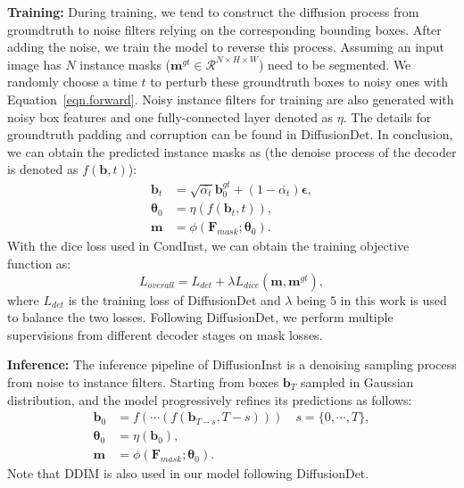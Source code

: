\documentclass{article}
\begin{document}
\noindent \textbf{Training:} During training, we tend to construct the diffusion process from groundtruth to noise filters relying on the corresponding bounding boxes. After adding the noise, we train the model to reverse this process. Assuming an input image has $N$ instance masks ($\mathbf{m}^{gt}\in \mathcal{R}^{N\times H \times W}$) need to be segmented. We randomly choose a time $t$ to perturb these groundtruth boxes to noisy ones with Equation~\ref{eqn.forward}. Noisy instance filters for training are also generated with noisy box features and one fully-connected layer denoted as $\eta$. The details for groundtruth padding and corruption can be found in DiffusionDet. In conclusion, we can obtain the predicted instance masks as (the denoise process of the decoder is denoted as $f(\bm{b},t)$): 
\begin{equation}
\begin{split}
\bm{b}_t &= \sqrt{\bar{\alpha_t}}\bm{b}^{gt}_0+(1-\bar{\alpha_t})\mathbf{\epsilon}, \\
\bm{\theta}_0 &= \eta(f(\bm{b}_t,t)), \\
\mathbf{m} &= \mathcal{\phi}(\mathbf{{F}}_{mask};\bm{\theta}_0).
\end{split}
\end{equation}
With the dice loss\cite{milletari2016v} used in CondInst, we can obtain the training objective function as:
\begin{equation}
L_{overall}= L_{det} + \lambda L_{dice}(\mathbf{m},\mathbf{m}^{gt}),
\end{equation}
where $L_{det}$ is the training loss of DiffusionDet and $\lambda$ being $5$ in this work is used to balance the two losses. Following DiffusionDet, we perform multiple supervisions from different decoder stages on mask losses.



\noindent \textbf{Inference:} The inference pipeline of DiffusionInst is a denoising sampling process from noise to instance filters. Starting from boxes $\bm{b}_T$ sampled in Gaussian distribution, and the model progressively refines its predictions as follows:
\begin{equation}
\begin{split}
\bm{b}_{0} &= f(\cdots (f(\bm{b}_{T-s},T-s))) \quad s=\{0,\cdots,T\}, \\
\bm{\theta}_{0} &= \eta(\bm{b}_{0}), \\
\mathbf{m} &= \mathcal{\phi}(\mathbf{{F}}_{mask};\bm{\theta}_{0}).
\end{split}
\end{equation}
Note that DDIM is also used in our model following DiffusionDet.
\end{document}
